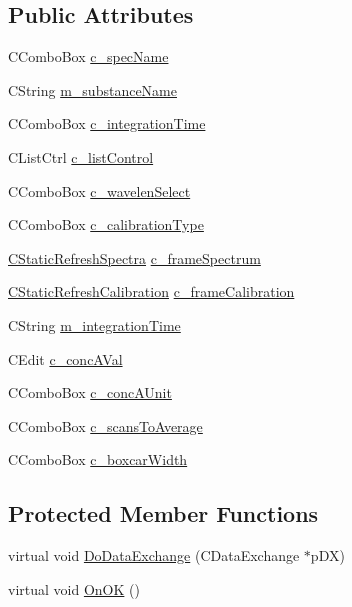 \subsection*{Public Attributes}
\begin{DoxyCompactItemize}
\item 
CComboBox \hyperlink{classCCalibrationDialog_a0a3a4fb91f59ada500e77bac22c3a11a}{c\_\-specName}
\item 
CString \hyperlink{classCCalibrationDialog_ac572ac6320283939a210f9d6b17a9647}{m\_\-substanceName}
\item 
CComboBox \hyperlink{classCCalibrationDialog_a5157376398273168ab3b68e1f887f6e2}{c\_\-integrationTime}
\item 
CListCtrl \hyperlink{classCCalibrationDialog_ad135265b9822e8d7fd5337625b41c874}{c\_\-listControl}
\item 
CComboBox \hyperlink{classCCalibrationDialog_a271c77a45d57fad3a49c8783f2f696a2}{c\_\-wavelenSelect}
\item 
CComboBox \hyperlink{classCCalibrationDialog_a9c2d4ea81e9024d6ed8d4fea43c7b866}{c\_\-calibrationType}
\item 
\hyperlink{classCStaticRefreshSpectra}{CStaticRefreshSpectra} \hyperlink{classCCalibrationDialog_a9a7358482a088c297a04c0f042bed923}{c\_\-frameSpectrum}
\item 
\hyperlink{classCStaticRefreshCalibration}{CStaticRefreshCalibration} \hyperlink{classCCalibrationDialog_a590aeaff751390fe3ef3b9aa681b3309}{c\_\-frameCalibration}
\item 
CString \hyperlink{classCCalibrationDialog_a69a425629aced9ff506f1335f8ddede1}{m\_\-integrationTime}
\item 
CEdit \hyperlink{classCCalibrationDialog_abacb72fe4123d5209a1811aec7720d6f}{c\_\-concAVal}
\item 
CComboBox \hyperlink{classCCalibrationDialog_af9ce66ade6c343a603a907dd436a2461}{c\_\-concAUnit}
\item 
CComboBox \hyperlink{classCCalibrationDialog_aefbb1953b1e9776bfcd6ed07ce752087}{c\_\-scansToAverage}
\item 
CComboBox \hyperlink{classCCalibrationDialog_ab6fc45fb9d6bb1174b444efd4ae04725}{c\_\-boxcarWidth}
\end{DoxyCompactItemize}
\subsection*{Protected Member Functions}
\begin{DoxyCompactItemize}
\item 
virtual void \hyperlink{classCCalibrationDialog_ae767d980b230184d3e631c5460891759}{DoDataExchange} (CDataExchange $\ast$pDX)
\item 
virtual void \hyperlink{classCCalibrationDialog_a64ccffda450c76e2f0fcd03b72f11eca}{OnOK} ()
\end{DoxyCompactItemize}


